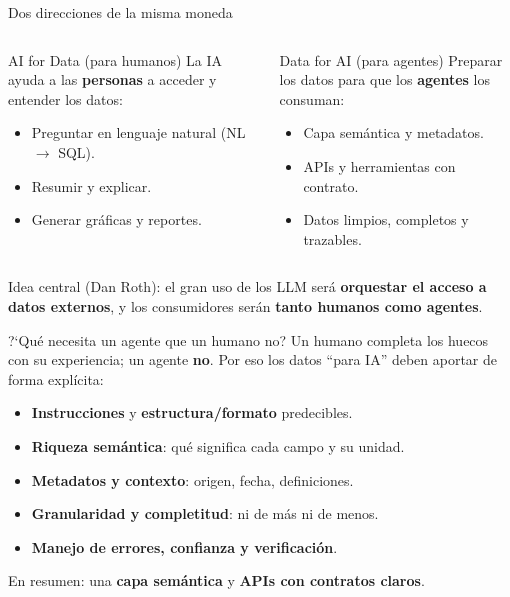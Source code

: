 \documentclass[aspectratio=169]{beamer}
\begin{document}
\begin{frame}{Dos direcciones de la misma moneda}
  \begin{columns}[t]
      \begin{block}{AI for Data (para humanos)}
        La IA ayuda a las \textbf{personas} a acceder y entender los datos:
        \begin{itemize}
          \item Preguntar en lenguaje natural (NL $\to$ SQL).
          \item Resumir y explicar.
          \item Generar gr\'aficas y reportes.
        \end{itemize}
      \end{block}
      \begin{block}{Data for AI (para agentes)}
        Preparar los datos para que los \textbf{agentes} los consuman:
        \begin{itemize}
          \item Capa sem\'antica y metadatos.
          \item APIs y herramientas con contrato.
          \item Datos limpios, completos y trazables.
        \end{itemize}
      \end{block}
  \end{columns}
  \vspace{0.4em}
  \footnotesize Idea central (Dan Roth): el gran uso de los LLM ser\'a
  \textbf{orquestar el acceso a datos externos}, y los consumidores ser\'an
  \textbf{tanto humanos como agentes}.
\end{frame}

\begin{frame}{?`Qu\'e necesita un agente que un humano no?}
  Un humano completa los huecos con su experiencia; un agente \textbf{no}. Por eso
  los datos ``para IA'' deben aportar de forma expl\'icita:
  \begin{itemize}
    \item \textbf{Instrucciones} y \textbf{estructura/formato} predecibles.
    \item \textbf{Riqueza sem\'antica}: qu\'e significa cada campo y su unidad.
    \item \textbf{Metadatos y contexto}: origen, fecha, definiciones.
    \item \textbf{Granularidad y completitud}: ni de m\'as ni de menos.
    \item \textbf{Manejo de errores, confianza y verificaci\'on}.
  \end{itemize}
  \vspace{0.2em}
  En resumen: una \textbf{capa sem\'antica} y \textbf{APIs con contratos claros}.
\end{frame}
\end{document}
